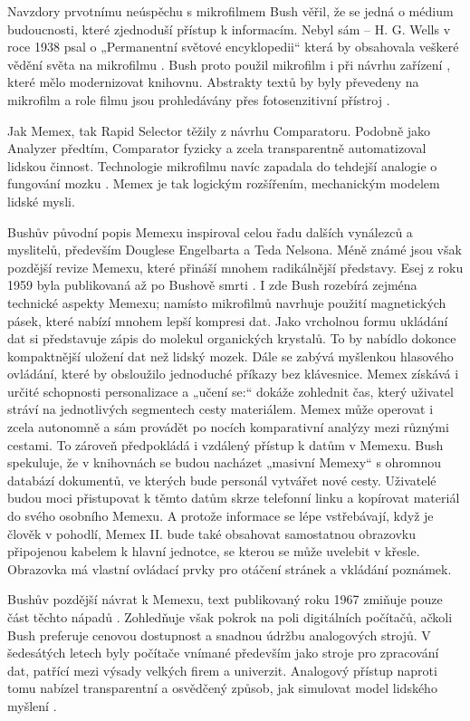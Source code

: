 Navzdory prvotnímu neúspěchu s mikrofilmem Bush věřil, že se jedná o médium budoucnosti, které zjednoduší přístup k informacím. Nebyl sám -- H. G. Wells v roce 1938 psal o „Permanentní světové encyklopedii“ která by obsahovala veškeré vědění světa na mikrofilmu \autocite[19]{Barnet2014}. Bush proto použil mikrofilm i při návrhu zařízení , které mělo modernizovat knihovnu. Abstrakty textů by byly převedeny na mikrofilm a role filmu jsou prohledávány přes fotosenzitivní přístroj \autocite[20]{Barnet2014}.

Jak Memex, tak Rapid Selector těžily z návrhu Comparatoru. Podobně jako Analyzer předtím, Comparator fyzicky a zcela transparentně automatizoval lidskou činnost. Technologie mikrofilmu navíc zapadala do tehdejší analogie o fungování mozku \autocite[18]{Barnet2014}. Memex je tak logickým rozšířením, mechanickým modelem lidské mysli.

\label{p:memex2}
Bushův původní popis Memexu inspiroval celou řadu dalších vynálezců a myslitelů, především Douglese Engelbarta a Teda Nelsona. Méně známé jsou však pozdější revize Memexu, které přináší mnohem radikálnější představy. Esej  z roku 1959 byla publikovaná až po Bushově smrti \autocite{Bush:Memex2}. I zde Bush rozebírá zejména technické aspekty Memexu; namísto mikrofilmů navrhuje použití magnetických pásek, které nabízí mnohem lepší kompresi dat. Jako vrcholnou formu ukládání dat si představuje zápis do molekul organických krystalů. To by nabídlo dokonce kompaktnější uložení dat než lidský mozek. Dále se zabývá myšlenkou hlasového ovládání, které by obsloužilo jednoduché příkazy bez klávesnice. Memex získává i určité schopnosti personalizace a „učení se:“ dokáže zohlednit čas, který uživatel stráví na jednotlivých segmentech cesty materiálem. Memex může operovat i zcela autonomně a sám provádět po nocích komparativní analýzy mezi různými cestami. To zároveň předpokládá i vzdálený přístup k datům v Memexu. Bush spekuluje, že v knihovnách se budou nacházet „masivní Memexy“ s ohromnou databází dokumentů, ve kterých bude personál vytvářet nové cesty. Uživatelé budou moci přistupovat k těmto datům skrze telefonní linku a kopírovat materiál do svého osobního Memexu. A protože informace se lépe vstřebávají, když je člověk v pohodlí, Memex II. bude také obsahovat samostatnou obrazovku připojenou kabelem k hlavní jednotce, se kterou se může uvelebit v křesle. Obrazovka má vlastní ovládací prvky pro otáčení stránek a vkládání poznámek.

Bushův pozdější návrat k Memexu, text  publikovaný roku 1967 zmiňuje pouze část těchto nápadů \autocite{Bush:MemexRev}. Zohledňuje však pokrok na poli digitálních počítačů, ačkoli Bush preferuje cenovou dostupnost a snadnou údržbu analogových strojů. V šedesátých letech byly počítače vnímané především jako stroje pro zpracování dat, patřící mezi výsady velkých firem a univerzit. Analogový přístup naproti tomu nabízel transparentní a osvědčený způsob, jak simulovat model lidského myšlení \autocite[202]{Wright2007}.

